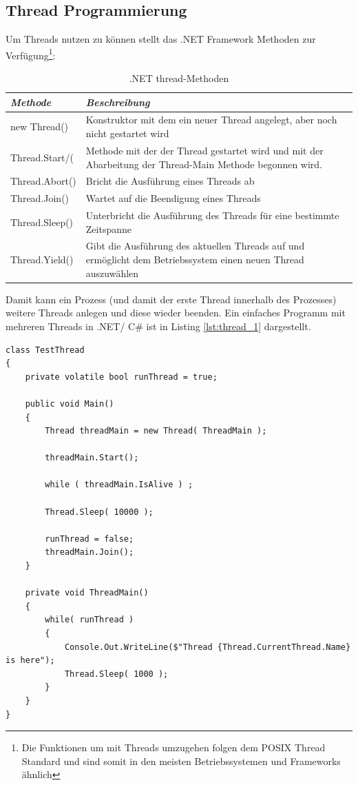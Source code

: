\subsection{Thread Programmierung}
Um Threads nutzen zu können stellt das .NET Framework  Methoden zur Verfügung\parencite{ms_threading}\footnote{Die Funktionen um mit Threads umzugehen folgen dem POSIX Thread Standard und sind somit in den meisten Betriebssystemen und Frameworks ähnlich\parencite{butenhof1997} }:
\begin{table}[]
	\centering
	\label{Ttab:thread-methoden}
	\begin{tabular}{| l | p{10cm} |}
		\hline
		\textit{\textbf{Methode}} & \textit{\textbf{Beschreibung}}  \\
		\hline
		new Thread()                                         &    Konstruktor mit dem ein neuer Thread angelegt, aber noch nicht gestartet wird\\
		\hline
		Thread.Start/(                                        &    Methode mit der der Thread gestartet wird und mit der Abarbeitung der Thread-Main Methode begonnen wird.\\
		\hline
		Thread.Abort()                                        &   Bricht die Ausführung eines Threads ab\\
		\hline
		Thread.Join()										 & Wartet auf die Beendigung eines Threads\\
		\hline
		Thread.Sleep()										& Unterbricht die Ausführung des Threads für eine bestimmte Zeitspanne\\
		\hline
		Thread.Yield()										& Gibt die Ausführung des aktuellen Threads auf und ermöglicht dem Betriebssystem einen neuen Thread auszuwählen\parencite{ms_threading_yield}\\
		\hline
	\end{tabular}
	\caption{.NET thread-Methoden}
\end{table}
Damit kann ein Prozess (und damit der erste Thread innerhalb des Prozesses) weitere Threads anlegen und diese wieder beenden. Ein einfaches Programm mit mehreren Threads in .NET/ C\# ist in Listing \ref{lst:thread_1} dargestellt.
\begin{lstlisting}[caption={Thread Hello World},label={lst:thread_1},captionpos=b]
class TestThread
{
	private volatile bool runThread = true;
	
	public void Main()
	{
		Thread threadMain = new Thread( ThreadMain );

		threadMain.Start();

		while ( threadMain.IsAlive ) ;

		Thread.Sleep( 10000 );

		runThread = false;
		threadMain.Join();
	}
	
	private void ThreadMain()
	{
		while( runThread )
		{
			Console.Out.WriteLine($"Thread {Thread.CurrentThread.Name} is here");
			Thread.Sleep( 1000 );
		}
	}
}
\end{lstlisting}
